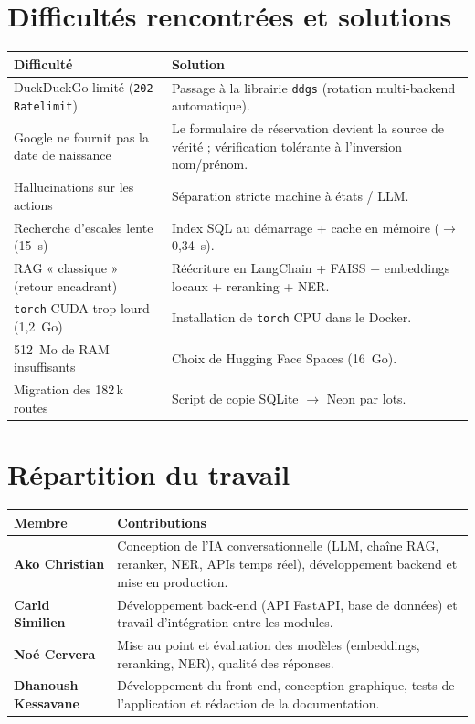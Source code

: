 \documentclass[11pt,a4paper]{article}
\newcommand{\code}[1]{\texttt{\small #1}}
\begin{document}
\section{Difficultés rencontrées et solutions}

\begin{center}
\renewcommand{\arraystretch}{1.3}
\begin{tabular}{p{6.2cm} p{8.1cm}}
\toprule
\textbf{Difficulté} & \textbf{Solution} \\
\midrule
DuckDuckGo limité (\code{202 Ratelimit}) & Passage à la librairie \code{ddgs}
(rotation multi-backend automatique). \\
Google ne fournit pas la date de naissance & Le formulaire de réservation devient la
source de vérité ; vérification tolérante à l'inversion nom/prénom. \\
Hallucinations sur les actions & Séparation stricte machine à états / LLM. \\
Recherche d'escales lente (15~s) & Index SQL au démarrage + cache en mémoire
($\rightarrow$ 0,34~s). \\
RAG « classique » (retour encadrant) & Réécriture en LangChain + FAISS + embeddings
locaux + reranking + NER. \\
\code{torch} CUDA trop lourd (1,2~Go) & Installation de \code{torch} CPU dans le Docker. \\
512~Mo de RAM insuffisants & Choix de Hugging Face Spaces (16~Go). \\
Migration des 182\,k routes & Script de copie SQLite $\rightarrow$ Neon par lots. \\
\bottomrule
\end{tabular}
\end{center}

\section{Répartition du travail}

\begin{center}
\renewcommand{\arraystretch}{1.3}
\begin{tabular}{>{\bfseries}l p{9.5cm}}
\toprule
Membre & Contributions \\
\midrule
Ako Christian & Conception de l'IA conversationnelle (LLM, chaîne RAG, reranker, NER,
APIs temps réel), développement backend et mise en production. \\
Carld Similien & Développement back-end (API FastAPI, base de données) et travail
d'intégration entre les modules. \\
Noé Cervera & Mise au point et évaluation des modèles (embeddings, reranking, NER),
qualité des réponses. \\
Dhanoush Kessavane & Développement du front-end, conception graphique, tests de
l'application et rédaction de la documentation. \\
\bottomrule
\end{tabular}
\end{center}
\end{document}

